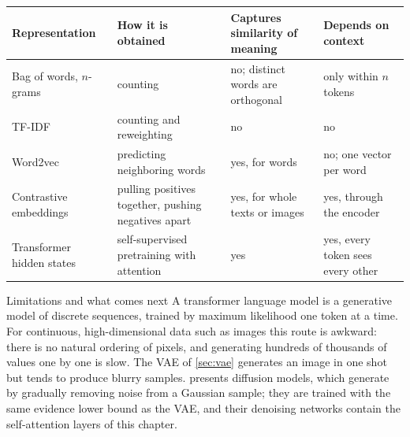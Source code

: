 \begin{center}
\small
\begin{tabularx}{\textwidth}{@{}l>{\raggedright\arraybackslash}X>{\raggedright\arraybackslash}X>{\raggedright\arraybackslash}X@{}}
\toprule
Representation & How it is obtained & Captures similarity of meaning & Depends on context \\
\midrule
Bag of words, $n$-grams & counting & no; distinct words are orthogonal & only within $n$ tokens \\
TF-IDF & counting and reweighting & no & no \\
Word2vec & predicting neighboring words & yes, for words & no; one vector per word \\
Contrastive embeddings & pulling positives together, pushing negatives apart & yes, for whole texts or images & yes, through the encoder \\
Transformer hidden states & self-supervised pretraining with attention & yes & yes, every token sees every other \\
\bottomrule
\end{tabularx}
\end{center}

\begin{notebox}{Limitations and what comes next}
A transformer language model is a generative model of discrete sequences, trained by maximum likelihood one token at a time. For continuous, high-dimensional data such as images this route is awkward: there is no natural ordering of pixels, and generating hundreds of thousands of values one by one is slow. The VAE of \cref{sec:vae} generates an image in one shot but tends to produce blurry samples.  presents diffusion models, which generate by gradually removing noise from a Gaussian sample; they are trained with the same evidence lower bound as the VAE, and their denoising networks contain the self-attention layers of this chapter.
\end{notebox}
